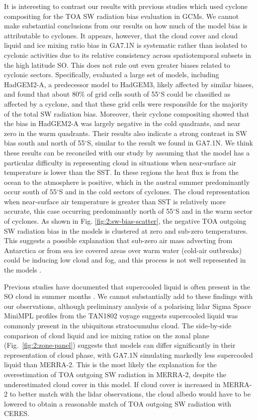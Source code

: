 It is interesting to contrast our results with previous studies which used
cyclone compositing for the TOA SW radiation bias evaluation in GCMs. We cannot
make substantial conclusions from our results on how much of the model bias is
attributable to cyclones. It appears, however, that the cloud cover and cloud
liquid and ice mixing ratio bias in GA7.1N is systematic rather than isolated to
cyclonic activities due to its relative consistency across spatiotemporal
subsets in the high latitude SO. This does not rule out even greater biases
related to cyclonic sectors. Specifically, \cite{bodas-salcedo2014} evaluated a
large set of models, including HadGEM2-A, a predecessor model to HadGEM3,
likely affected by similar biases, and found that about 80\% of grid cells
south of 55$^\circ$S could be classified as affected by a cyclone, and that
these grid cells were responsible for the majority of the total SW radiation
bias.  Moreover, their cyclone compositing showed that the bias in HadGEM2-A
was largely negative in the cold quadrants, and near zero in the warm
quadrants.  Their results also indicate a strong contrast in SW bias south and
north of 55$^\circ$S, similar to the result we found in GA7.1N.  We think these
results can be reconciled with our study by assuming that the model has a
particular difficulty in representing cloud in situations when near-surface air
temperature is lower than the SST. In these regions the heat flux is from the
ocean to the atmosphere is positive, which in the austral summer predominantly
occur south of 55$^\circ$S and in the cold sectors of cyclones. The cloud
representation when near-surface air temperature is greater than SST is
relatively more accurate, this case occurring predominantly north of
55$^\circ$S and in the warm sector of cyclones.  As shown in Fig.
\ref{fig:2:sw-bias-scatter}, the negative TOA outgoing SW radiation bias in the
models is clustered at zero and sub-zero temperatures. This suggests a
possible explanation that sub-zero air mass advecting from Antarctica or from
sea ice covered areas over warm water (cold-air outbreaks) could be inducing low cloud and fog, and
this process is not well represented in the models \citep{bodas-salcedo2012}.

Previous studies have documented that supercooled liquid is often present in
the SO cloud in summer months \citep{morrison2011,huang2012,chubb2013,huang2016,bodas-salcedo2016,jolly2018,listowski2019}. We cannot substantially add to these findings
with our observations, although preliminary analysis of a polarising lidar
Sigma Space MiniMPL profiles from the TAN1802 voyage suggests supercooled
liquid was commonly present in the ubiquitous stratocumulus cloud. The
side-by-side comparison of cloud liquid and ice mixing ratios on the zonal
plane (Fig.~\ref{fig:2:zone-panel}) suggests that models can differ
significantly in their representation of cloud phase, with GA7.1N simulating
markedly less supercooled liquid than MERRA-2. This is the most likely
the explanation for the overestimation of TOA outgoing SW radiation in MERRA-2,
despite the underestimated cloud cover in this model. If cloud cover is
increased in MERRA-2 to better match with the lidar observations, the cloud
albedo would have to be lowered to obtain a reasonable match of TOA outgoing SW
radiation with CERES.

